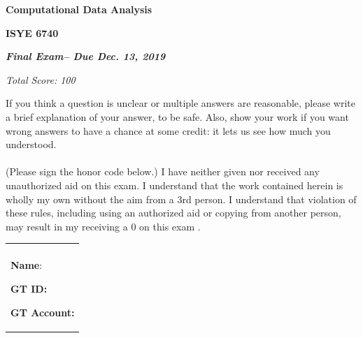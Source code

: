 \documentclass[a4paper,12pt,fleqn]{article}
\newcommand{\titlehd}{Computational Data Analysis}
\newcommand{\examtype}{\bf Final Exam}
\newcommand{\examdate}{Due Dec. 13, 2019}
\newcommand{\examcode}{ISYE 6740}
\newcommand{\total}{100}
\begin{document}
\begin{center}
\large\textbf{\titlehd}
\end{center}

\begin{center}
\large\textbf{\examcode}
\end{center}

\begin{center}
\textit{ \examtype -- \examdate}
\end{center}


\begin{center}
\textit{Total Score: \total}
\end{center}

\vspace{2cm}
If you think a question is unclear or multiple answers are reasonable, please write a brief explanation of your answer,
 to be safe. Also, show your work if you want wrong answers to have a chance at some credit: it lets us see how much you understood.\\\\
(Please sign the honor code below.) I have neither given nor received any unauthorized aid on this exam. I understand that the work contained herein is wholly my own without the aim from a 3rd person. I understand that violation of these rules, including using an authorized aid or copying from another person,
may result in my receiving a 0 on this exam .
\begin{table}[h]
\centering
\begin{tabular}{m{8cm}}
\\
\\
\vspace{0.2in}
\textbf{Name}: 
\vspace{0.7in}

\textbf{GT ID:}
\vspace{0.7in}


\textbf{GT Account:}
\end{tabular}
\end{table}
\newpage
\end{document}
